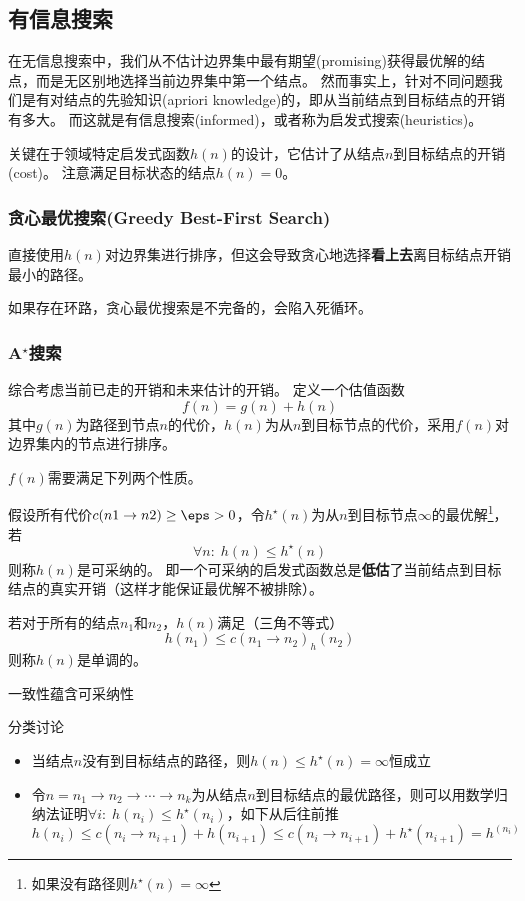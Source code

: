 
\subsection{有信息搜索}
在无信息搜索中，我们从不估计边界集中最有期望(promising)获得最优解的结点，而是无区别地选择当前边界集中第一个结点。
然而事实上，针对不同问题我们是有对结点的先验知识(apriori knowledge)的，即从当前结点到目标结点的开销有多大。
而这就是有信息搜索(informed)，或者称为启发式搜索(heuristics)。

关键在于领域特定启发式函数$h(n)$的设计，它估计了从结点$n$到目标结点的开销(cost)。
注意满足目标状态的结点$h(n)=0$。

\subsubsection{贪心最优搜索(Greedy Best-First Search)}
直接使用$h(n)$对边界集进行排序，但这会导致贪心地选择\textbf{看上去}离目标结点开销最小的路径。

如果存在环路，贪心最优搜索是不完备的，会陷入死循环。

\subsubsection{A$^\star$搜索}
综合考虑当前已走的开销和未来估计的开销。
定义一个估值函数
\[f(n)=g(n)+h(n)\]
其中$g(n)$为路径到节点$n$的代价，$h(n)$为从$n$到目标节点的代价，采用$f(n)$对边界集内的节点进行排序。

$f(n)$需要满足下列两个性质。
\begin{definition}
假设所有代价$c(n1\to n2)\geq\eps>0$，令$h^\star(n)$为从$n$到目标节点$\infty$的最优解\footnote{如果没有路径则$h^\star(n)=\infty$}，若
\[\forall n:\;h(n)\leq h^\star(n)\]
则称$h(n)$是可采纳的。
即一个可采纳的启发式函数总是\textbf{低估}了当前结点到目标结点的真实开销（这样才能保证最优解不被排除）。
\end{definition}
\begin{definition}
若对于所有的结点$n_1$和$n_2$，$h(n)$满足（三角不等式）
\[h(n_1)\leq c(n_1\to n_2)_h(n_2)\]
则称$h(n)$是单调的。
\end{definition}

\begin{theorem}
一致性蕴含可采纳性
\end{theorem}
\begin{analysis}
分类讨论
\begin{itemize}
	\item 当结点$n$没有到目标结点的路径，则$h(n)\leq h^\star(n)=\infty$恒成立
	\item 令$n=n_1\to n_2\to\cdots\to n_k$为从结点$n$到目标结点的最优路径，则可以用数学归纳法证明$\forall i:\;h(n_i)\leq h^\star(n_i)$，如下从后往前推
	\[h(n_{i})\leq c(n_i\to n_{i+1})+h(n_{i+1})\leq c(n_i\to n_{i+1}) + h^\star(n_{i+1})=h^(n_i)\]
\end{itemize}
\end{analysis}

